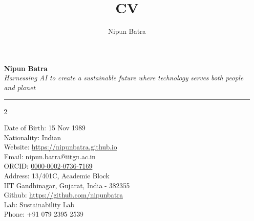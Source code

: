 \documentclass[letter,10pt]{article}
\title{CV}
\author{Nipun Batra}
\begin{document}
\setlength\itemsep{-0.5em}
\setlength\parskip{0.1em}
\renewcommand{\baselinestretch}{1.0}

\begin{center}
	{\Large\textbf{Nipun Batra}}\\[0.2em]
	\textit{Harnessing AI to create a sustainable future where technology serves both people and planet}
\end{center}

\ifcvshort\else
\vspace{0.4em}
\noindent\rule{\textwidth}{0.5pt}
\vspace{-0.1em}
\fi

\vspace{0.3em}



\begin{multicols}{2}
\begin{small}
\noindent Date of Birth: 15 Nov 1989 \\
Nationality: Indian \\
Website: \href{https://nipunbatra.github.io}{https://nipunbatra.github.io} \\ 
Email: \href{mailto:nipun.batra@iitgn.ac.in}{nipun.batra@iitgn.ac.in} \\
ORCID: \href{https://orcid.org/0000-0002-0736-7169}{0000-0002-0736-7169} \\
Address: 13/401C, Academic Block\\
	IIT Gandhinagar,
	Gujarat, India - 382355\\
Github: \href{https://github.com/nipunbatra}{https://github.com/nipunbatra}\\
Lab: \href{https://sustainability-lab.github.io/}{Sustainability Lab} \\
Phone: +91 079 2395 2539
\end{small}
\end{multicols}
\end{document}
